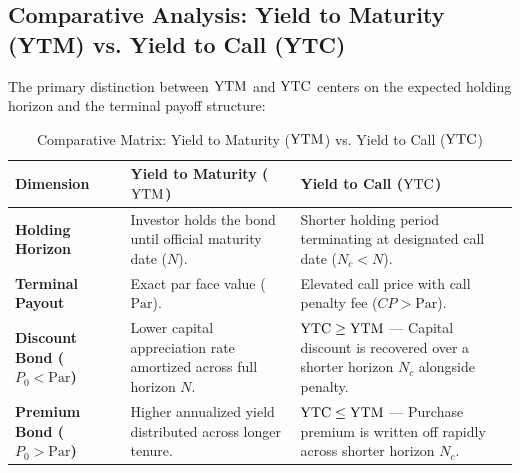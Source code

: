 \subsection{Comparative Analysis: Yield to Maturity (YTM) vs. Yield to Call (YTC)}
The primary distinction between $\operatorname{YTM}$ and $\operatorname{YTC}$ centers on the expected holding horizon and the terminal payoff structure:

\begin{table}[htbp]
\centering
\small
\renewcommand{\arraystretch}{1.25}
\begin{tabularx}{\linewidth}{l X X}
\toprule
\textbf{Dimension} & \textbf{Yield to Maturity ($\operatorname{YTM}$)} & \textbf{Yield to Call ($\operatorname{YTC}$)} \\
\midrule
\textbf{Holding Horizon} & Investor holds the bond until official maturity date ($N$). & Shorter holding period terminating at designated call date ($N_c < N$). \\
\textbf{Terminal Payout} & Exact par face value ($\text{Par}$). & Elevated call price with call penalty fee ($CP > \text{Par}$). \\
\textbf{Discount Bond ($P_0 < \text{Par}$)} & Lower capital appreciation rate amortized across full horizon $N$. & $\mathbf{\operatorname{YTC} \ge \operatorname{YTM}}$ --- Capital discount is recovered over a shorter horizon $N_c$ alongside penalty. \\
\textbf{Premium Bond ($P_0 > \text{Par}$)} & Higher annualized yield distributed across longer tenure. & $\mathbf{\operatorname{YTC} \le \operatorname{YTM}}$ --- Purchase premium is written off rapidly across shorter horizon $N_c$. \\
\bottomrule
\end{tabularx}
\caption{Comparative Matrix: Yield to Maturity ($\operatorname{YTM}$) vs. Yield to Call ($\operatorname{YTC}$)}
\label{tab:ytm_vs_ytc}
\end{table}

